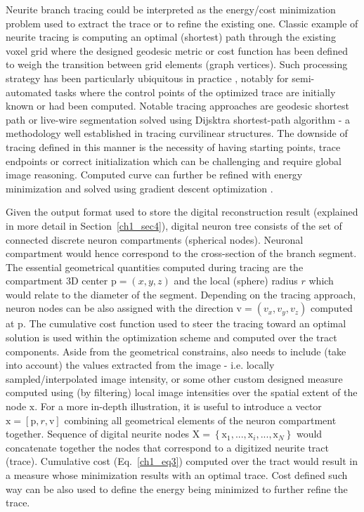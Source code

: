 Neurite branch tracing could be interpreted as the energy/cost minimization problem \cite{meijering2004design,peng2010automatic} used to extract the trace or to refine the existing one. Classic example of neurite tracing is computing an optimal (shortest) path through the existing voxel grid where the designed geodesic metric or cost function has been defined to weigh the transition between grid elements (graph vertices). Such processing strategy has been particularly ubiquitous in practice \cite{meijering2004design,peng2010v3d,longair2011simple}, notably for semi-automated tasks where the control points of the optimized trace are initially known or had been computed. Notable tracing approaches are geodesic shortest path \cite{peng2010automatic} or live-wire segmentation \cite{meijering2004design} solved using Dijsktra shortest-path algorithm \cite{dijkstra1959note} - a methodology well established in tracing curvilinear structures. The downside of tracing defined in this manner is the necessity of having starting points, trace endpoints or correct initialization which can be challenging and require global image reasoning. Computed curve can further be refined with energy minimization and solved using gradient descent optimization \cite{peng2007straightening,peng2010automatic}. 

Given the output format used to store the digital reconstruction result (explained in more detail in Section~\ref{ch1_sec4}), digital neuron tree consists of the set of connected discrete neuron compartments (spherical nodes). Neuronal compartment would hence correspond to the cross-section of the branch segment. The essential geometrical quantities computed during tracing are the compartment 3D center $\mathrm{p} = (x, y, z)$ and the local (sphere) radius $r$ which would relate to the diameter of the segment. Depending on the tracing approach, neuron nodes can be also assigned with the direction $ \mathrm{v} = ( v_x, v_y, v_z ) $ computed at $\mathrm{p}$. The cumulative cost function used to steer the tracing toward an optimal solution is used within the optimization scheme and computed over the tract components. Aside from the geometrical constrains, also needs to include (take into account) the values extracted from the image - i.e. locally sampled/interpolated image intensity, or some other custom designed measure computed using (by filtering) local image intensities over the spatial extent of the node $\mathrm{x}$. For a more in-depth illustration, it is useful to introduce a vector $\mathrm{x} = \left[  \mathrm{p}, r, \mathrm{v} \right] $ combining all geometrical elements of the neuron compartment together. Sequence of digital neurite nodes $\mathrm{X} = \left\lbrace \mathrm{x}_1, ... , \mathrm{x}_i, ..., \mathrm{x}_N \right\rbrace$ would concatenate together the nodes that correspond to a digitized neurite tract (trace). Cumulative cost (Eq.~\ref{ch1_eq3}) computed over the tract would result in a measure whose minimization results with an optimal trace. Cost defined such way can be also used to define the energy being minimized to further refine the trace.%

